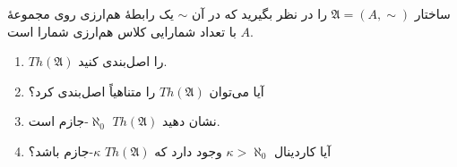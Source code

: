 ساختار $\mathfrak{A} = (A, \sim)$ را در نظر بگیرید که در آن $\sim$ یک رابطهٔ هم‌ارزی روی مجموعهٔ $A$ با تعداد شمارایی کلاس هم‌ارزی شمارا است.
\begin{enumerate}[label=(\alph*)]
  \item $Th(\mathfrak{A})$ را اصل‌بندی کنید.
  \item آیا می‌توان $Th(\mathfrak{A})$ را متناهیاً اصل‌بندی کرد؟
  \item نشان دهید $Th(\mathfrak{A})$ $\aleph_0$-جازم است.
  \item آیا کاردینال $\kappa > \aleph_0$ وجود دارد که $Th(\mathfrak{A})$ $\kappa$-جازم باشد؟
\end{enumerate}\quad
\begin{ans}
\end{ans}
